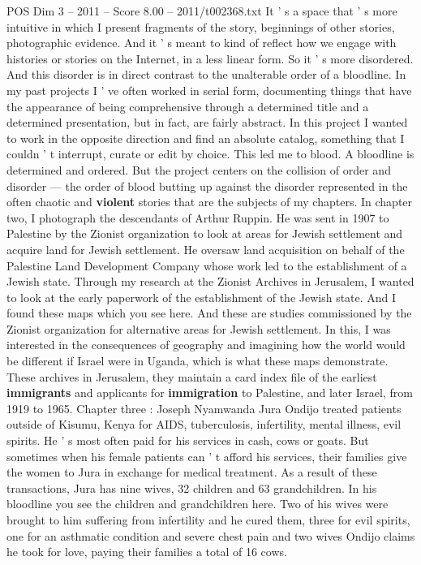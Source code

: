 \begin{textsample}{POS Dim 3 – 2011 – Score 8.00 – 2011/t002368.txt}
It ' s a space that ' s more intuitive in which I present fragments of the story, beginnings of other stories, photographic evidence.
And it ' s meant to kind of reflect how we engage with histories or stories on the Internet, in a less linear form.
So it ' s more disordered.
And this disorder is in direct contrast to the unalterable order of a bloodline.
In my past projects I ' ve often worked in serial form, documenting things that have the appearance of being comprehensive through a determined title and a determined presentation, but in fact, are fairly abstract.
In this project I wanted to work in the opposite direction and find an absolute catalog, something that I couldn ' t interrupt, curate or edit by choice.
This led me to blood.
A bloodline is determined and ordered.
But the project centers on the collision of order and disorder — the order of blood butting up against the disorder represented in the often chaotic and \textbf{violent} stories that are the subjects of my chapters.
In chapter two, I photograph the descendants of Arthur Ruppin.
He was sent in 1907 to Palestine by the Zionist organization to look at areas for Jewish settlement and acquire land for Jewish settlement.
He oversaw land acquisition on behalf of the Palestine Land Development Company whose work led to the establishment of a Jewish state.
Through my research at the Zionist Archives in Jerusalem, I wanted to look at the early paperwork of the establishment of the Jewish state.
And I found these maps which you see here.
And these are studies commissioned by the Zionist organization for alternative areas for Jewish settlement.
In this, I was interested in the consequences of geography and imagining how the world would be different if Israel were in Uganda, which is what these maps demonstrate.
These archives in Jerusalem, they maintain a card index file of the earliest \textbf{immigrants} and applicants for \textbf{immigration} to Palestine, and later Israel, from 1919 to 1965.
Chapter three : Joseph Nyamwanda Jura Ondijo treated patients outside of Kisumu, Kenya for AIDS, tuberculosis, infertility, mental illness, evil spirits.
He ' s most often paid for his services in cash, cows or goats.
But sometimes when his female patients can ' t afford his services, their families give the women to Jura in exchange for medical treatment.
As a result of these transactions, Jura has nine wives, 32 children and 63 grandchildren.
In his bloodline you see the children and grandchildren here.
Two of his wives were brought to him suffering from infertility and he cured them, three for evil spirits, one for an asthmatic condition and severe chest pain and two wives Ondijo claims he took for love, paying their families a total of 16 cows.

\end{textsample}
